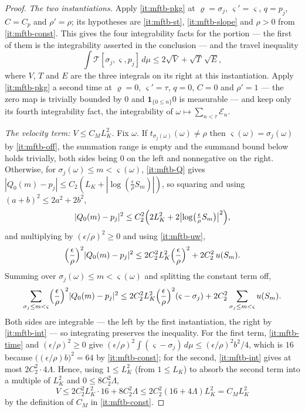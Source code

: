 \begin{proof}
\emph{The two instantiations.} Apply \ref{it:mftb-pkg} at
$\varrho=\sigma_j$, $\varsigma'=\varsigma$, $q=p_j$, $C=C_p$ and
$\rho'=\rho$; its hypotheses are \ref{it:mftb-st}, \ref{it:mftb-slope} and
$\rho>0$ from \ref{it:mftb-const}. This gives the four integrability facts for
the portion --- the first of them is the integrability asserted in the
conclusion --- and the travel inequality
\begin{equation}\label{eq:mftb-cs}
  \int\mathcal T[\sigma_j,\varsigma,p_j]\,d\mu
  \le2\sqrt{V}+\sqrt{T}\,\sqrt{E},
\end{equation}
where $V$, $T$ and $E$ are the three integrals on its right at this
instantiation. Apply \ref{it:mftb-pkg} a second time at
$\varrho=0$, $\varsigma'=\tau$, $q=0$, $C=0$ and $\rho'=1$ --- the zero map is
trivially bounded by $0$ and $\mathbf1_{\{0\le n\}}0$ is measurable --- and keep
only its fourth integrability fact, the integrability of
$\omega\mapsto\sum_{n<\tau}\mathcal E_n$.

\emph{The velocity term: $V\le C_ML_K^2$.} Fix $\omega$. If
$t_{\sigma_j(\omega)}(\omega)\ne\rho$ then $\varsigma(\omega)=\sigma_j(\omega)$
by \ref{it:mftb-off}, the summation range is empty and the summand bound below
holds trivially, both sides being $0$ on the left and nonnegative on the right.
Otherwise, for $\sigma_j(\omega)\le m<\varsigma(\omega)$, \ref{it:mftb-Q} gives
$|Q_0(m)-p_j|\le C_2(L_K+|\log(\tfrac\epsilon\rho S_m)|)$, so squaring and using
$(a+b)^2\le2a^2+2b^2$,
\[
  |Q_0(m)-p_j|^2
   \le C_2^2\Bigl(2L_K^2+2\bigl|\log\bigl(\tfrac\epsilon\rho S_m\bigr)\bigr|^2\Bigr),
\]
and multiplying by $(\epsilon/\rho)^2\ge0$ and using \ref{it:mftb-uw},
\[
  \Bigl(\frac\epsilon\rho\Bigr)^2|Q_0(m)-p_j|^2
   \le2C_2^2L_K^2\Bigl(\frac\epsilon\rho\Bigr)^2+2C_2^2\,u(S_m).
\]
Summing over $\sigma_j(\omega)\le m<\varsigma(\omega)$ and splitting the
constant term off,
\[
  \sum_{\sigma_j\le m<\varsigma}\Bigl(\frac\epsilon\rho\Bigr)^2|Q_0(m)-p_j|^2
   \le2C_2^2L_K^2\Bigl(\frac\epsilon\rho\Bigr)^2(\varsigma-\sigma_j)
     +2C_2^2\sum_{\sigma_j\le m<\varsigma}u(S_m).
\]
Both sides are integrable --- the left by the first instantiation, the right by
\ref{it:mftb-int} --- so integrating preserves the inequality. For the first
term, \ref{it:mftb-time} and $(\epsilon/\rho)^2\ge0$ give
$(\epsilon/\rho)^2\int(\varsigma-\sigma_j)\,d\mu\le(\epsilon/\rho)^2b^2/4$,
which is $16$ because $\bigl((\epsilon/\rho)b\bigr)^2=64$ by
\ref{it:mftb-const}; for the second, \ref{it:mftb-int} gives at most
$2C_2^2\cdot4\Lambda$. Hence, using $1\le L_K^2$ (from $1\le L_K$) to absorb the
second term into a multiple of $L_K^2$ and $0\le8C_2^2\Lambda$,
\[
  V\le2C_2^2L_K^2\cdot16+8C_2^2\Lambda
   \le2C_2^2(16+4\Lambda)L_K^2=C_ML_K^2
\]
by the definition of $C_M$ in \ref{it:mftb-const}.


\end{proof}
